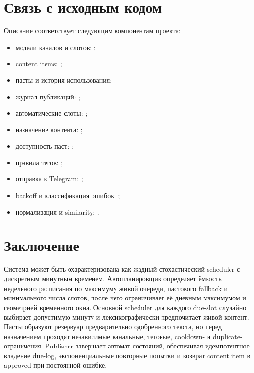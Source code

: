\documentclass[12pt,a4paper]{article}
\begin{document}
\section{Связь с исходным кодом}

Описание соответствует следующим компонентам проекта:

\begin{itemize}
  \item модели каналов и слотов: ;
  \item content items: ;
  \item пасты и история использования: ;
  \item журнал публикаций: ;
  \item автоматические слоты: ;
  \item назначение контента: ;
  \item доступность паст: ;
  \item правила тегов: ;
  \item отправка в Telegram: ;
  \item backoff и классификация ошибок: ;
  \item нормализация и similarity: .
\end{itemize}

\section{Заключение}

Система может быть охарактеризована как жадный стохастический scheduler с
дискретным минутным временем. Автопланировщик определяет ёмкость недельного
расписания по максимуму живой очереди, пастового fallback и минимального числа
слотов, после чего ограничивает её дневным максимумом и геометрией временного
окна. Основной scheduler для каждого due-slot случайно выбирает допустимую минуту
и лексикографически предпочитает живой контент. Пасты образуют резервуар
предварительно одобренного текста, но перед назначением проходят независимые
канальные, теговые, cooldown- и duplicate-ограничения. Publisher завершает
автомат состояний, обеспечивая идемпотентное владение due-log, экспоненциальные
повторные попытки и возврат content item в approved при постоянной ошибке.
\end{document}
